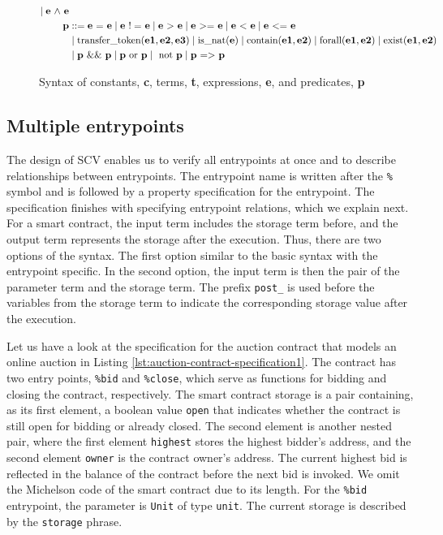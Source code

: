 \documentclass[runningheads]{llncs}
\begin{document}
\begin{figure}[tp]
\begin{align*}
\mid \textbf{e} \text{ $\wedge$ } \textbf{e}  \\
\textbf{p} & :: = \textbf{e} \text{ = } \textbf{e}
\mid \textbf{e} \text{ $!=$ } \textbf{e}
\mid \textbf{e} \text{ $>$ } \textbf{e}
\mid \textbf{e} \text{ $>=$ } \textbf{e}
\mid \textbf{e} \text{ $<$ } \textbf{e}
\mid \textbf{e} \text{ $<=$ } \textbf{e} \\
& \mid \text{transfer\_token} (\textbf{e1}, \textbf{e2}, \textbf{e3})  
 \mid \text{is\_nat} (\textbf{e})  
 \mid \text{contain} (\textbf{e1}, \textbf{e2}) 
 \mid \text{forall} (\textbf{e1}, \textbf{e2})
\mid \text{exist} (\textbf{e1}, \textbf{e2}) \\
& \mid \textbf{p} \text{ \&\& } \textbf{p}\mid \textbf{p} \text{ or } \textbf{p}  
\mid  \text{ not } \textbf{p} \mid \textbf{p} \text{ $=>$ } \textbf{p} \\
\end{align*}
\caption{Syntax of constants, \textbf{c}, terms, \textbf{t}, expressions, \textbf{e}, and predicates, \textbf{p}}
\label{fig:syntax-terms-predicates}
\end{figure}
\subsection{Multiple entrypoints}
\label{sec:multiple-entrypoint}
The design of SCV enables us to verify all entrypoints
at once and to describe relationships between entrypoints. The entrypoint name is written after the \lstinline/%/ symbol and is followed by a property specification for the entrypoint.  The specification finishes with specifying entrypoint relations, which we explain next. For a smart contract, the input term includes the storage term before, and the output term represents the storage after the execution. Thus, there are two options of the syntax. The first option similar to the basic syntax with the entrypoint specific.  
In the second option, the input term is then the pair of the parameter term and the storage term. The prefix \lstinline/post_/ is used before the variables from the storage term to indicate the corresponding storage value after the execution.

Let us have a look at the specification for the auction
contract that models an online auction in Listing \ref{lst:auction-contract-specification1}. The contract has two entry points, \lstinline|%bid| and \lstinline|%close|, which serve as functions for bidding and closing the contract, respectively. The smart contract storage is a pair containing, as its first element, a boolean value \lstinline|open| that indicates whether the contract is still open for bidding or already closed. The second element is another nested pair, where the first element \lstinline|highest| stores the highest bidder's address, and the second element \lstinline|owner| is the contract owner's address. The current highest bid is reflected in the balance of the contract before the next bid is invoked. We omit the Michelson code of the smart contract due to its length.  For the \lstinline/%bid/ entrypoint, the parameter is \lstinline/Unit/ of type \lstinline/unit/.
The current storage is described by the \lstinline|storage| phrase. 
\end{document}
